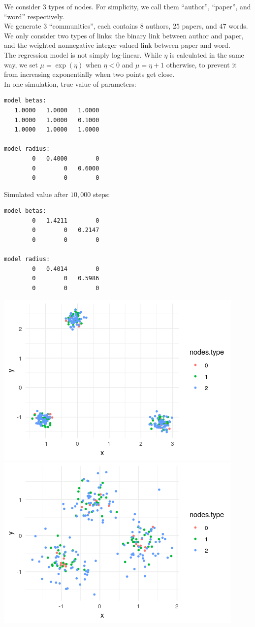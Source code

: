 \documentclass{article}
\begin{document}
We consider 3 types of nodes. For simplicity, we call them ``author'', ``paper'', and ``word'' respectively.\\
We generate $3$ ``communities'', each contains $8$ authors, $25$ papers, and $47$ words. We only consider two types of links: the binary link between author and paper, and the weighted nonnegative integer valued link between paper and word.\\
The regression model is not simply log-linear. While $\eta$ is calculated in the same way, we set $\mu = \exp(\eta)$ when $\eta < 0$ and $\mu = \eta + 1$ otherwise, to prevent it from increasing exponentially when two points get close.\\
In one simulation, true value of parameters:
\begin{verbatim}
model betas: 
   1.0000   1.0000   1.0000
   1.0000   1.0000   0.1000
   1.0000   1.0000   1.0000

model radius: 
        0   0.4000        0
        0        0   0.6000
        0        0        0

\end{verbatim}
Simulated value after $10,000$ steps:
\begin{verbatim}
model betas: 
        0   1.4211        0
        0        0   0.2147
        0        0        0

model radius: 
        0   0.4014        0
        0        0   0.5986
        0        0        0

\end{verbatim}
\includegraphics[scale=1]{sim_true.png}
\includegraphics[scale=1]{sim_t1.png}
\end{document}
